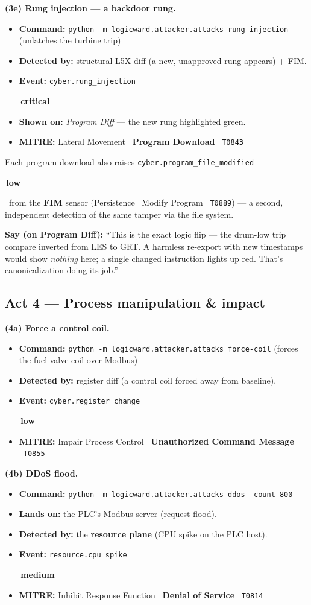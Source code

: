 \documentclass[11pt,a4paper]{article}
\newcommand{\code}[1]{\texttt{\small #1}}
\newcommand{\sev}[2]{\colorbox{#1}{\small\strut\,#2\,}}
\newcommand{\crit}{\sev{critbg}{\color{critical}\textbf{critical}}}
\newcommand{\med}{\sev{medbg}{\color{warn}\textbf{medium}}}
\newcommand{\low}{\sev{lowbg}{\color{muted}\textbf{low}}}
\begin{document}
\textbf{(3e) Rung injection --- a backdoor rung.}
\begin{itemize}[leftmargin=1.3em,itemsep=1pt]
  \item \textbf{Command:} \code{python -m logicward.attacker.attacks rung-injection} (unlatches the turbine trip)
  \item \textbf{Detected by:} structural L5X diff (a new, unapproved rung appears) + FIM.
  \item \textbf{Event:} \code{cyber.rung\_injection} \quad\crit
  \item \textbf{Shown on:} \emph{Program Diff} --- the new rung highlighted green.
  \item \textbf{MITRE:} Lateral Movement \textbullet\ \textbf{Program Download} \textbullet\ \code{T0843}
\end{itemize}
Each program download also raises \code{cyber.program\_file\_modified} \low\ from the
\textbf{FIM} sensor (Persistence \textbullet\ Modify Program \textbullet\ \code{T0889}) --- a second,
independent detection of the same tamper via the file system.

\begin{say}\textbf{Say (on Program Diff):} ``This is the exact logic flip --- the drum-low
trip compare inverted from LES to GRT. A harmless re-export with new timestamps would show
\emph{nothing} here; a single changed instruction lights up red. That's canonicalization
doing its job.''\end{say}

\subsection{Act 4 --- Process manipulation \& impact}
\textbf{(4a) Force a control coil.}
\begin{itemize}[leftmargin=1.3em,itemsep=1pt]
  \item \textbf{Command:} \code{python -m logicward.attacker.attacks force-coil} (forces the fuel-valve coil over Modbus)
  \item \textbf{Detected by:} register diff (a control coil forced away from baseline).
  \item \textbf{Event:} \code{cyber.register\_change} \quad\low
  \item \textbf{MITRE:} Impair Process Control \textbullet\ \textbf{Unauthorized Command Message} \textbullet\ \code{T0855}
\end{itemize}

\textbf{(4b) DDoS flood.}
\begin{itemize}[leftmargin=1.3em,itemsep=1pt]
  \item \textbf{Command:} \code{python -m logicward.attacker.attacks ddos --count 800}
  \item \textbf{Lands on:} the PLC's Modbus server (request flood).
  \item \textbf{Detected by:} the \textbf{resource plane} (CPU spike on the PLC host).
  \item \textbf{Event:} \code{resource.cpu\_spike} \quad\med
  \item \textbf{MITRE:} Inhibit Response Function \textbullet\ \textbf{Denial of Service} \textbullet\ \code{T0814}
\end{itemize}
\end{document}
